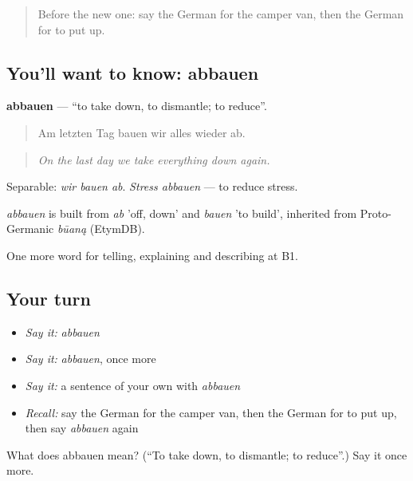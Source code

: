 \label{lesson:GE-C425-abbauen}



\begin{quote}
Before the new one: say the German for the camper van, then the German for to put up.
\end{quote}

\subsection*{You'll want to know: abbauen}
\textbf{abbauen} — \textquotedblleft{}to take down, to dismantle; to reduce\textquotedblright{}.

\begin{quote}
Am letzten Tag bauen wir alles wieder ab.
\end{quote}

\begin{quote}
\emph{On the last day we take everything down again.}
\end{quote}

Separable: \emph{wir bauen ab}. \emph{Stress abbauen} — to reduce stress.

\begin{cousinweb}
\emph{abbauen} is built from \emph{ab} 'off, down' and \emph{bauen} 'to build', inherited from Proto-Germanic \emph{būaną} (EtymDB).
\end{cousinweb}

\begin{grammarlens}[title={What you've built}]
One more word for telling, explaining and describing at B1.
\end{grammarlens}

\subsection*{Your turn}
\begin{itemize}
\raggedright
  \item \emph{Say it:} \emph{abbauen}
  \item \emph{Say it:} \emph{abbauen}, once more
  \item \emph{Say it:} a sentence of your own with \emph{abbauen}
  \item \emph{Recall:} say the German for the camper van, then the German for to put up, then say \emph{abbauen} again
\end{itemize}

\begin{tcolorbox}[breakable,colback=teal!4,colframe=teal!35!black,title={Before you move on}]
What does abbauen mean? (\textquotedblleft{}To take down, to dismantle; to reduce\textquotedblright{}.) Say it once more.
\end{tcolorbox}
